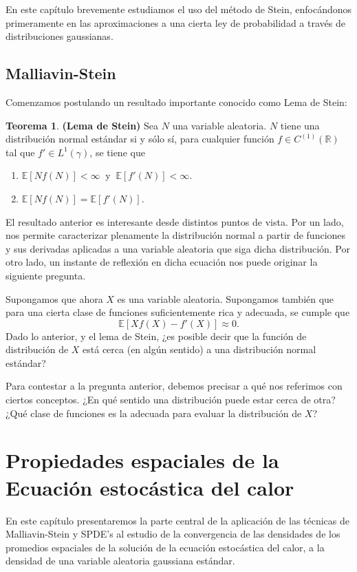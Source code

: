 \documentclass[letterpaper,twoside]{book}
\newcommand{\R}{\mathbb{R}}
\newcommand{\E}{\mathbb{E}}
\newcommand{\1}{\mathds{1}}
\theoremstyle{definition}
\theoremstyle{definition}
\newtheorem{teo}{Teorema}
\theoremstyle{definition}
\theoremstyle{definition}
\theoremstyle{definition}
\theoremstyle{definition}
\theoremstyle{definition}
\begin{document}
En este capítulo brevemente estudiamos el uso del método de Stein, enfocándonos primeramente en las aproximaciones a una cierta ley de probabilidad a través de distribuciones gaussianas.
\section{Malliavin-Stein}
Comenzamos postulando un resultado importante conocido como Lema de Stein:
\begin{teo}\textbf{(Lema de Stein)} Sea $N$ una variable aleatoria. $N$ tiene una distribución normal estándar si y sólo sí, para cualquier función $f\in C^{(1)}(\R)$ tal que $f'\in L^{1}(\gamma)$, se tiene que
    \begin{enumerate}
        \item $\E\left[Nf(N)\right]<\infty \ $ y $ \ \E\left[f'(N)\right]<\infty$.
        \item $\E\left[Nf(N)\right]=\E\left[f'(N)\right]$.
    \end{enumerate}
 \end{teo}
El resultado anterior es interesante desde distintos puntos de vista. Por un lado, nos permite caracterizar plenamente la distribución normal a partir de funciones y sus derivadas aplicadas a una variable aleatoria que siga dicha distribución. Por otro lado, un instante de reflexión en dicha ecuación nos puede originar la siguiente pregunta.

Supongamos que ahora $X$ es una variable aleatoria. Supongamos también que para una cierta clase de funciones suficientemente rica y adecuada, se cumple que 
\[
\E\left[Xf(X)-f'(X)\right]\approx0.    
\]
Dado lo anterior, y el lema de Stein, ¿es posible decir que la función de distribución de $X$ está cerca (en algún sentido) a una distribución normal estándar?

Para contestar a la pregunta anterior, debemos precisar a qué nos referimos con ciertos conceptos. ¿En qué sentido una distribución puede estar cerca de otra? ¿Qué clase de funciones es la adecuada para evaluar la distribución de $X$? 

\chapter{Propiedades espaciales de la Ecuación estocástica del calor}
En este capítulo presentaremos la parte central de la aplicación de las técnicas de Malliavin-Stein y SPDE's al estudio de la convergencia de las densidades de los promedios espaciales de la solución de la ecuación estocástica del calor, a la densidad de una variable aleatoria gaussiana estándar.
\end{document}
